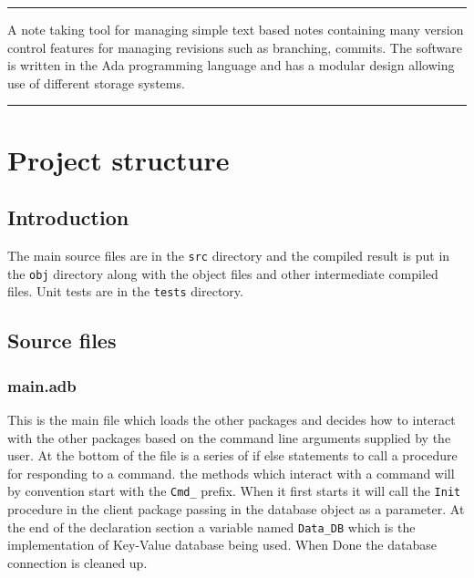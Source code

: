 \documentclass[12pt,a4paper]{article}
\title{\textbf{\Title}}
\author{\Author}
\date{}
\renewenvironment{abstract}{%
\hfill\begin{minipage}{0.95\textwidth}
\rule{\textwidth}{1pt}}
{\par\noindent\rule{\textwidth}{1pt}\end{minipage}}
\newcommand{\codetext}[1]{\colorbox{light-gray}{\texttt{#1}}}
\begin{document}
\clearpage
\maketitle
%
\begin{abstract}
A note taking tool for managing simple text based notes containing many version
control features for managing revisions such as branching, commits. The
software is written in the Ada programming language and has a modular design
allowing use of different storage systems.
\end{abstract}

\renewcommand\cftsecleader{\cftdotfill{\cftdotsep}}

\tableofcontents
\thispagestyle{empty}
\pagebreak
\setcounter{page}{1}


\section{Project structure}

\subsection{Introduction}
The main source files are in the \codetext{src} directory and the compiled
result is put in the \codetext{obj} directory along with the object files and
other intermediate compiled files. Unit tests are in the \codetext{tests}
directory.

\subsection{Source files}
\subsubsection{main.adb}
This is the main file which loads the other packages and decides how to
interact with the other packages based on the command line arguments supplied
by the user. At the bottom of the file is a series of if else statements to
call a procedure for responding to a command. the methods which interact with a
command will by convention start with the \codetext{Cmd\_} prefix. When it
first starts it will call the \codetext{Init} procedure in the client package
passing in the database object as a parameter. At the end of the declaration
section a variable named \codetext{Data\_DB} which is the implementation of
Key-Value database being used. When Done the database connection is cleaned up.
\end{document}

